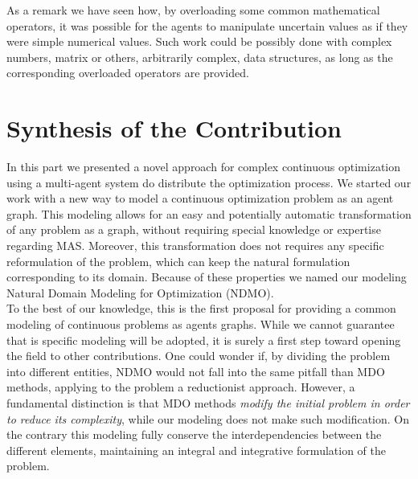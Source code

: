 As a remark we have seen how, by overloading some common mathematical operators, it was possible for the agents to manipulate uncertain values as if they were simple numerical values. Such work could be possibly done with complex numbers, matrix or others, arbitrarily complex, data structures, as long as the corresponding overloaded operators are provided.

\chapter*{Synthesis of the Contribution}

In this part we presented a novel approach for complex continuous optimization using a multi-agent system do distribute the optimization process. We started our work with a new way to model a continuous optimization problem as an agent graph. This modeling allows for an easy and potentially automatic transformation of any problem as a graph, without requiring special knowledge or expertise regarding MAS. Moreover, this transformation does not requires any specific reformulation of the problem, which can keep the natural formulation corresponding to its domain. Because of these properties we named our modeling Natural Domain Modeling for Optimization (NDMO).
\\
To the best of our knowledge, this is the first proposal for providing a common modeling of continuous problems as agents graphs. While we cannot guarantee that is specific modeling will be adopted, it is surely a first step toward opening the field to other contributions. One could wonder if, by dividing the problem into different entities, NDMO would not fall into the same pitfall than MDO methods, applying to the problem a reductionist approach. However, a fundamental distinction is that MDO methods \emph{modify the initial problem in order to reduce its complexity}, while our modeling does not make such modification. On the contrary this modeling fully conserve the interdependencies between the different elements, maintaining an integral and integrative formulation of the problem.

